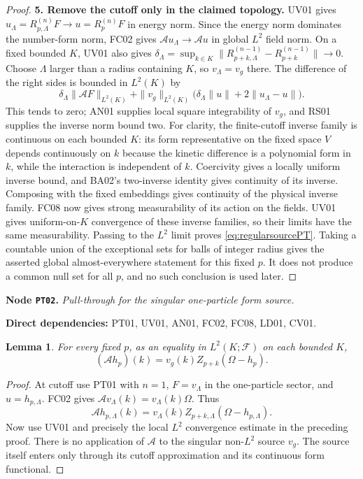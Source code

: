 \documentclass[11pt,a4paper]{article}
\newtheorem{lemma}[theorem]{Lemma}
\theoremstyle{remark}\newtheorem{remark}[theorem]{Remark}
\newcommand{\F}{\mathcal F}\newcommand{\Q}{\mathcal Q}\newcommand{\HH}{\mathcal H}
\newcommand{\node}[3]{\par\Needspace{6\baselineskip}\smallskip\hypertarget{node:#1}{}\label{nodepage:#1}\noindent\textbf{Node \texttt{#1}.} \textit{#2.}\par\noindent\textbf{Direct dependencies:} #3.\par}
\begin{document}
\begin{proof}
\textbf{5. Remove the cutoff only in the claimed topology.}
UV01 gives $u_\Lambda=R_{p,\Lambda}^{(n)}F\to u=R_p^{(n)}F$ in energy norm. Since the energy norm dominates the number-form norm, FC02 gives $\mathcal Au_\Lambda\to\mathcal Au$ in global $L^2$ field norm. On a fixed bounded $K$, UV01 also gives
$\delta_\Lambda=\sup_{k\in K}\|R_{p+k,\Lambda}^{(n-1)}-R_{p+k}^{(n-1)}\|\to0$.
Choose $\Lambda$ larger than a radius containing $K$, so $v_\Lambda=v_g$ there. The difference of the right sides is bounded in $L^2(K)$ by
\[
 \delta_\Lambda\|\mathcal AF\|_{L^2(K)}
 +\|v_g\|_{L^2(K)}
   \bigl(\delta_\Lambda\|u\|+2\|u_\Lambda-u\|\bigr).
\]
This tends to zero; AN01 supplies local square integrability of $v_g$, and RS01 supplies the inverse norm bound two. For clarity, the finite-cutoff inverse family is continuous on each bounded $K$: its form representative on the fixed space $V$ depends continuously on $k$ because the kinetic difference is a polynomial form in $k$, while the interaction is independent of $k$. Coercivity gives a locally uniform inverse bound, and BA02's two-inverse identity gives continuity of its inverse. Composing with the fixed embeddings gives continuity of the physical inverse family. FC08 now gives strong measurability of its action on the fields. UV01 gives uniform-on-$K$ convergence of these inverse families, so their limits have the same measurability. Passing to the $L^2$ limit proves \eqref{eq:regularsourcePT}. Taking a countable union of the exceptional sets for balls of integer radius gives the asserted global almost-everywhere statement for this fixed $p$. It does not produce a common null set for all $p$, and no such conclusion is used later.
\end{proof}


\node{PT02}{Pull-through for the singular one-particle form source}{PT01, UV01, AN01, FC02, FC08, LD01, CV01}
\begin{lemma}\label{lem:sourcePT}
For every fixed $p$, as an equality in $L^2(K;\F)$ on each bounded $K$,
\begin{equation}
 (\mathcal A h_p)(k)=v_g(k)Z_{p+k}(\Omega-h_p).
 \label{eq:sourcePT}
\end{equation}
\end{lemma}
\begin{proof}
At cutoff use PT01 with $n=1$, $F=v_\Lambda$ in the one-particle sector, and $u=h_{p,\Lambda}$. FC02 gives
$\mathcal A v_\Lambda(k)=v_\Lambda(k)\Omega$. Thus
\[
 \mathcal A h_{p,\Lambda}(k)
   =v_\Lambda(k)Z_{p+k,\Lambda}(\Omega-h_{p,\Lambda}).
\]
Now use UV01 and precisely the local $L^2$ convergence estimate in the preceding proof. There is no application of $\mathcal A$ to the singular non-$L^2$ source $v_g$. The source itself enters only through its cutoff approximation and its continuous form functional.
\end{proof}
\end{document}

